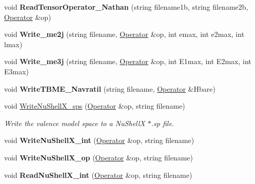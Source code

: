 \begin{DoxyCompactItemize}
\item 
void {\bfseries Read\+Tensor\+Operator\+\_\+\+Nathan} (string filename1b, string filename2b, \hyperlink{classOperator}{Operator} \&op)\hypertarget{classReadWrite_af4c7d4f545695db53e159981e13ad8d0}{}\label{classReadWrite_af4c7d4f545695db53e159981e13ad8d0}

\item 
void {\bfseries Write\+\_\+me2j} (string filename, \hyperlink{classOperator}{Operator} \&op, int emax, int e2max, int lmax)\hypertarget{classReadWrite_ac4e620913e1aa49ef541d2a0b7c631c5}{}\label{classReadWrite_ac4e620913e1aa49ef541d2a0b7c631c5}

\item 
void {\bfseries Write\+\_\+me3j} (string filename, \hyperlink{classOperator}{Operator} \&op, int E1max, int E2max, int E3max)\hypertarget{classReadWrite_a3aef884e7dca533e3abd10abf67feedb}{}\label{classReadWrite_a3aef884e7dca533e3abd10abf67feedb}

\item 
void {\bfseries Write\+T\+B\+M\+E\+\_\+\+Navratil} (string filename, \hyperlink{classOperator}{Operator} \&Hbare)\hypertarget{classReadWrite_a2b803d12e3fb1236f9fd80cb00de32a2}{}\label{classReadWrite_a2b803d12e3fb1236f9fd80cb00de32a2}

\item 
void \hyperlink{classReadWrite_a8a7dc85b22c8f468d153d3fde9f39394}{Write\+Nu\+Shell\+X\+\_\+sps} (\hyperlink{classOperator}{Operator} \&op, string filename)\hypertarget{classReadWrite_a8a7dc85b22c8f468d153d3fde9f39394}{}\label{classReadWrite_a8a7dc85b22c8f468d153d3fde9f39394}

\begin{DoxyCompactList}\small\item\em Write the valence model space to a Nu\+ShellX $\ast$.sp file. \end{DoxyCompactList}\item 
void {\bfseries Write\+Nu\+Shell\+X\+\_\+int} (\hyperlink{classOperator}{Operator} \&op, string filename)\hypertarget{classReadWrite_a2028159ab7f8c227613834b39794e157}{}\label{classReadWrite_a2028159ab7f8c227613834b39794e157}

\item 
void {\bfseries Write\+Nu\+Shell\+X\+\_\+op} (\hyperlink{classOperator}{Operator} \&op, string filename)\hypertarget{classReadWrite_a5a0bd2b64e5c2e7fc4d7de4301b8a5f9}{}\label{classReadWrite_a5a0bd2b64e5c2e7fc4d7de4301b8a5f9}

\item 
void {\bfseries Read\+Nu\+Shell\+X\+\_\+int} (\hyperlink{classOperator}{Operator} \&op, string filename)\hypertarget{classReadWrite_a380dd0fc6e0fb36b68f573c463b34bfd}{}\label{classReadWrite_a380dd0fc6e0fb36b68f573c463b34bfd}


\end{DoxyCompactItemize}
